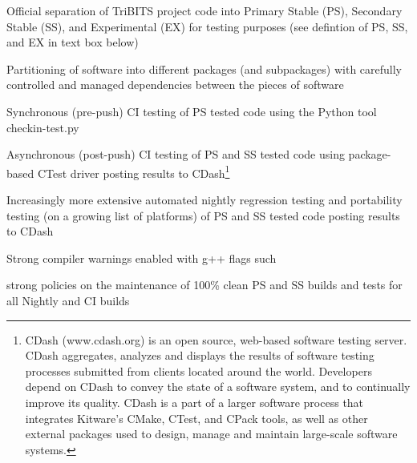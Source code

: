 \documentclass[11pt]{SANDreport}
\begin{document}
\begin{compactitem}

{}\item Official separation of TriBITS project code into Primary Stable (PS),
Secondary Stable (SS), and Experimental (EX) for testing purposes (see
defintion of PS, SS, and EX in text box below)

{}\item Partitioning of software into different packages (and
subpackages) with carefully controlled and managed dependencies
between the pieces of software

{}\item Synchronous (pre-push) CI testing of PS tested code using the
Python tool checkin-test.py

{}\item Asynchronous (post-push) CI testing of PS and SS tested code
using package-based CTest driver posting results to
CDash\footnote{CDash (www.cdash.org) is an open source, web-based
software testing server. CDash aggregates, analyzes and displays the
results of software testing processes submitted from clients located
around the world. Developers depend on CDash to convey the state of a
software system, and to continually improve its quality. CDash is a
part of a larger software process that integrates Kitware's CMake,
CTest, and CPack tools, as well as other external packages used to
design, manage and maintain large-scale software systems.}

{}\item Increasingly more extensive automated nightly regression
testing and portability testing (on a growing list of platforms) of PS
and SS tested code posting results to CDash

{}\item Strong compiler warnings enabled with g++ flags such
{}

{}\item strong policies on the maintenance of 100\% clean PS and SS
builds and tests for all Nightly and CI builds

\end{compactitem}
\end{document}
